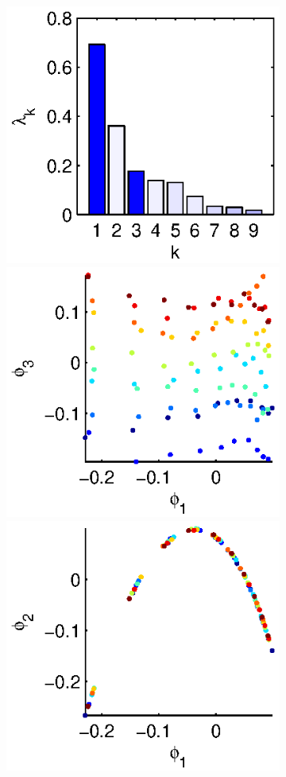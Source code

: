 \begin{figure}[t]
\begin{subfigure}[t]{1.5in}
\vspace{\figheight}
\caption{}
\end{subfigure}
%
\begin{subfigure}[t]{1.5in}
\centering
\includegraphics[height=\figheight]{chemotaxis2_evals}
\includegraphics[height=\figheight]{chemotaxis2_embed_good}
\includegraphics[height=\figheight]{chemotaxis2_embed_bad}

\end{subfigure}
\end{figure}
